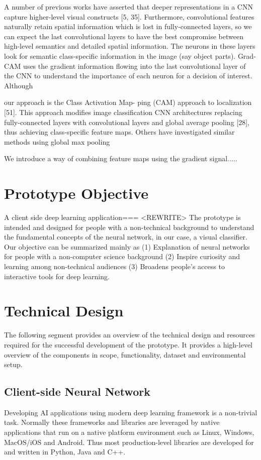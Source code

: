 A number of previous works have asserted that deeper representations in a CNN capture higher-level visual constructs [5, 35]. Furthermore, convolutional features naturally retain spatial information which is lost in fully-connected layers, so we can expect the last convolutional layers to have the best compromise between high-level semantics and detailed spatial information. The neurons in these layers look for semantic class-specific information in the image (say object parts). Grad-CAM uses the gradient information flowing into the last convolutional layer of the CNN to understand the importance of each neuron for a decision of interest. Although

our approach is the Class Activation Map-
ping (CAM) approach to localization [51]. This approach modifies image classification CNN architectures replacing fully-connected layers with convolutional layers and global average pooling [28], thus achieving class-specific feature maps. Others have investigated similar methods using global max pooling

We introduce a way of combining feature maps using the gradient signal.....

\section{Prototype Objective}
A client side deep learning application===
<REWRITE> The prototype is intended and designed for people with a non-technical background to understand the fundamental concepts of the neural network, in our case, a visual classifier. Our objective can be summarized mainly as (1) Explanation of neural networks for people with a non-computer science background (2) Inspire curiosity and learning among non-technical audiences  (3) Broadens people's access to interactive tools for deep learning.

\section{Technical Design}
The following segment provides an overview of the technical design and resources required for the successful development of the prototype. It provides a high-level overview of the components in scope, functionality, dataset and environmental setup.

\subsection{Client-side Neural Network}
Developing AI applications using modern deep learning framework is a non-trivial task. Normally these frameworks and libraries are leveraged by native applications that run on a native platform environment such as Linux, Windows, MacOS/iOS and Android. Thus most production-level libraries are developed for and written in Python, Java and C++. 

